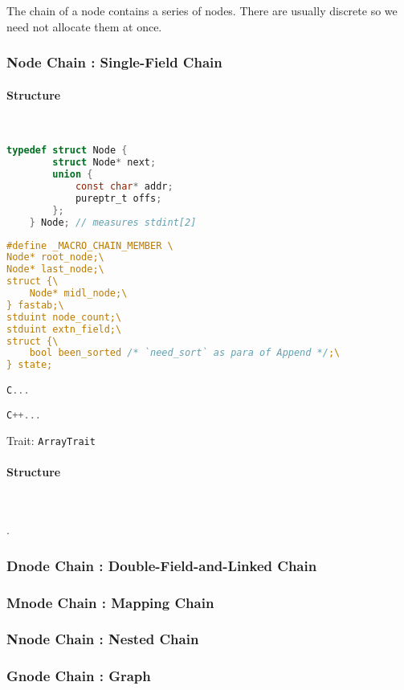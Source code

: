 
The chain of a node contains a series of nodes. There are usually discrete so we need not allocate them at once.

\subsubsection{Node Chain : Single-Field Chain}

\paragraph{Structure} \

\lstset{style=GlobalC}
\begin{lstlisting}[language=C]
	typedef struct Node {
		struct Node* next;
		union {
			const char* addr;
			pureptr_t offs;
		};
	} Node; // measures stdint[2]
\end{lstlisting}

\lstset{style=GlobalC}
\begin{lstlisting}[language=C]
#define _MACRO_CHAIN_MEMBER \
Node* root_node;\
Node* last_node;\
struct {\
	Node* midl_node;\
} fastab;\
stduint node_count;\
stduint extn_field;\
struct {\
	bool been_sorted /* `need_sort` as para of Append */;\
} state;

C...

C++...

\end{lstlisting}
Trait:  \verb|ArrayTrait|

\paragraph{Structure} \

.

\subsubsection{Dnode Chain : Double-Field-and-Linked Chain}

\subsubsection{Mnode Chain : Mapping Chain}

\subsubsection{Nnode Chain : Nested Chain}

\subsubsection{Gnode Chain : Graph}


